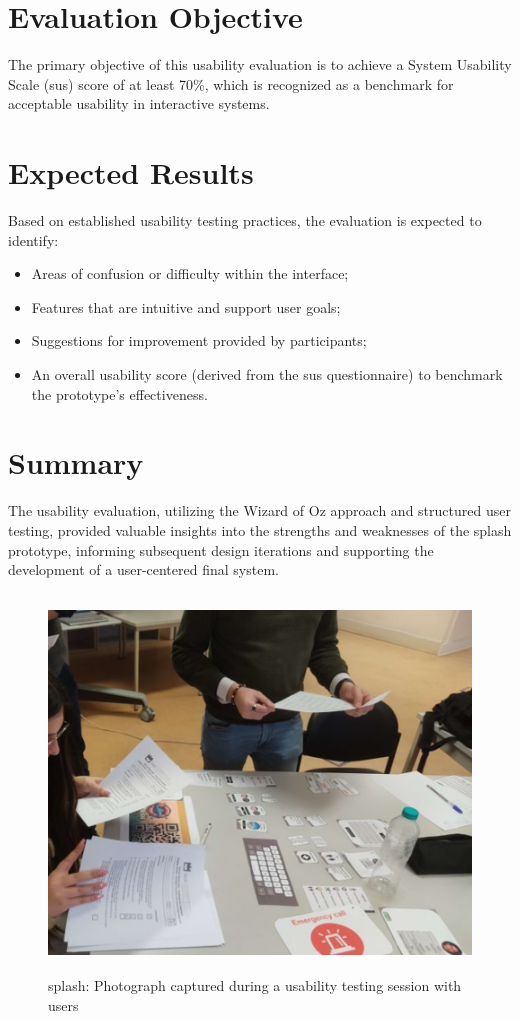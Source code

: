 \section{Evaluation Objective}
The primary objective of this usability evaluation is to achieve a System Usability Scale (\acf{sus}) score of at least 70\%, which is recognized as a benchmark for acceptable usability in interactive systems.

\section{Expected Results}
Based on established usability testing practices, the evaluation is expected to identify:
\begin{itemize}
    \item Areas of confusion or difficulty within the interface;
    \item Features that are intuitive and support user goals;
    \item Suggestions for improvement provided by participants;
    \item An overall usability score (derived from the \ac{sus} questionnaire) to benchmark the prototype’s effectiveness.
\end{itemize}

\section{Summary}
The usability evaluation, utilizing the Wizard of Oz approach and structured user testing, provided valuable insights into the strengths and weaknesses of the \ac{splash} prototype, informing subsequent design iterations and supporting the development of a user-centered final system.

\begin{figure}[H]
    \centering
    \includegraphics[width=13cm,height=10cm]{figs/mockup-tests.png}
    \caption{\ac{splash}: Photograph captured during a usability testing session with users}
    \label{fig:usability-testing}
\end{figure}

